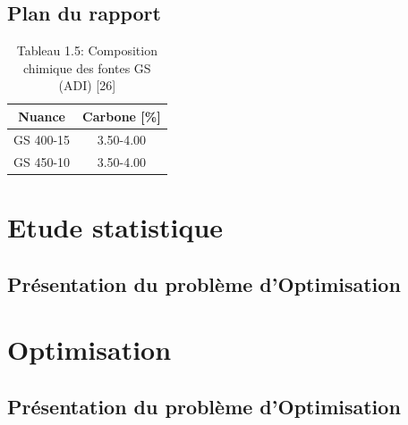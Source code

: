 \documentclass[12pt]{article}
\begin{document}


\subsection{Plan du rapport }

\begin{table}[H]
    \caption{Tableau 1.5: Composition chimique des fontes GS (ADI) [26]}
    \centering
        \begin{tabular}{|c|c|}
        \hline
        Nuance & Carbone [\%] \\ \hline
        GS 400-15 & 3.50-4.00  \\ \hline
        GS 450-10 & 3.50-4.00  \\ \hline
        \end{tabular}
\end{table}
    
    


\section{Etude statistique }

\subsection{Présentation du problème d'Optimisation }



\section{Optimisation}

\subsection{Présentation du problème d'Optimisation }
\end{document}
